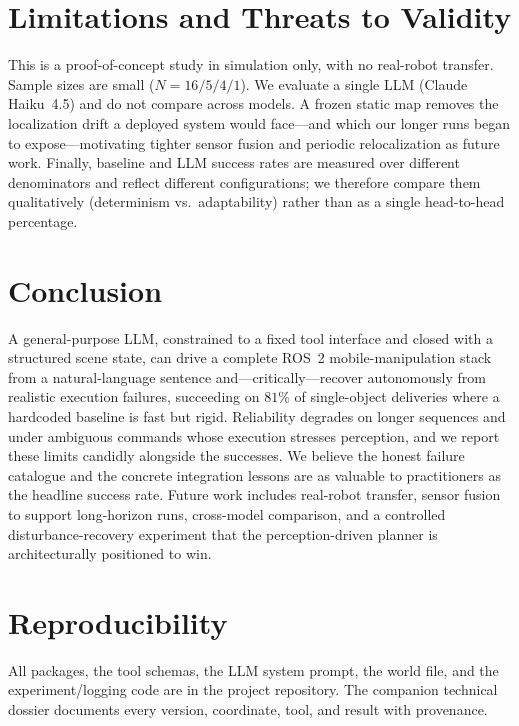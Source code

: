 \documentclass[conference]{IEEEtran}
\begin{document}
\section{Limitations and Threats to Validity}
This is a proof-of-concept study in simulation only, with no real-robot transfer.
Sample sizes are small ($N=16/5/4/1$). We evaluate a single LLM (Claude Haiku~4.5)
and do not compare across models. A frozen static map removes the localization
drift a deployed system would face---and which our longer runs began to
expose---motivating tighter sensor fusion and periodic relocalization as future
work. Finally, baseline and LLM success rates are measured over different
denominators and reflect different configurations; we therefore compare them
qualitatively (determinism vs.\ adaptability) rather than as a single head-to-head
percentage.

\section{Conclusion}
A general-purpose LLM, constrained to a fixed tool interface and closed with a
structured scene state, can drive a complete ROS~2 mobile-manipulation stack from
a natural-language sentence and---critically---recover autonomously from realistic
execution failures, succeeding on $81\%$ of single-object deliveries where a
hardcoded baseline is fast but rigid. Reliability degrades on longer sequences and
under ambiguous commands whose execution stresses perception, and we report these
limits candidly alongside the successes. We believe the honest failure catalogue
and the concrete integration lessons are as valuable to practitioners as the
headline success rate. Future work includes real-robot transfer, sensor fusion to
support long-horizon runs, cross-model comparison, and a controlled
disturbance-recovery experiment that the perception-driven planner is
architecturally positioned to win.

\section*{Reproducibility}
All packages, the tool schemas, the LLM system prompt, the world file, and the
experiment/logging code are in the project repository. The companion technical
dossier documents every version, coordinate, tool, and result with provenance.
\end{document}
